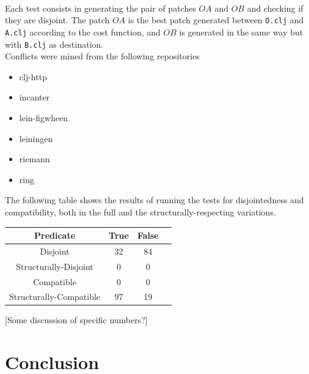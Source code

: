 \documentclass[11pt, titlepage]{article}
\newcommand{\toHaskell}[1]{\texttt{#1}\xspace}
\begin{document}
\\
Each test consists in generating the pair of patches $OA$ and $OB$ and checking if they are disjoint. 
The patch $OA$ is the best patch generated between \texttt{O.clj} and \texttt{A.clj} according to the cost function, and $OB$ is generated in the same way but with \toHaskell{B.clj} as destination.
\\
Conflicts were mined from the following repositories
 \begin{itemize}
    \item clj-http
    \item incanter
    \item lein-figwheen
    \item leiningen
    \item riemann
    \item ring
 \end{itemize}

The following table shows the results of running the tests for disjointedness and compatibility, both in the full and the structurally-respecting variations. 
\\
\begin{center}
 \begin{tabular} { ||c|c|c|c|| }
   \hline Predicate & True & False  \\
   \hline
   \hline Disjoint & 32 & 84 \\
   \hline Structurally-Disjoint & 0 & 0 \\
   \hline Compatible & 0 & 0 \\
   \hline Structurally-Compatible & 97 & 19 \\
   \hline
 \end{tabular}
\end{center}

[Some discussion of specific numbers?]
\section{Conclusion}
\end{document}
